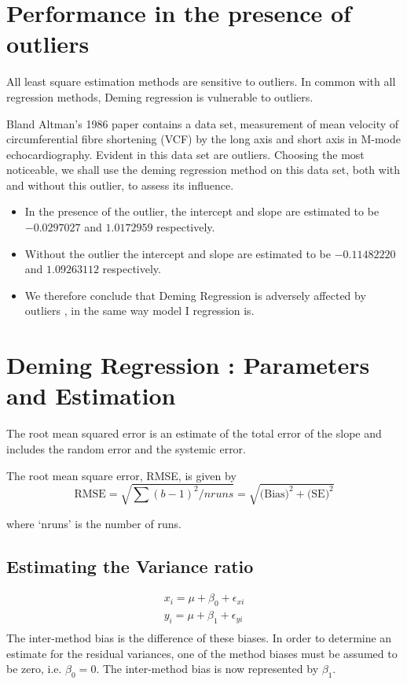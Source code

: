 \documentclass[12pt, a4paper]{report}
\theoremstyle{plain}
\theoremstyle{definition}
\theoremstyle{remark}
\begin{document}
\section{Performance in the presence of outliers}
All least square estimation methods are sensitive to outliers.
In common with all regression methods, Deming regression is vulnerable to outliers. 

Bland Altman's 1986 paper contains a data set, measurement of mean velocity of circumferential fibre shortening (VCF) by the long axis and short axis in M-mode echocardiography. Evident in this data set are outliers. Choosing the most noticeable, we shall use the deming regression method on this data set, both with and
without this outlier, to assess its influence.
\begin{itemize}
	\item In the presence of the outlier, the intercept and slope are estimated to be $-0.0297027$ and $1.0172959$ respectively.
	\item Without the outlier the intercept and slope are estimated to be
	$-0.11482220$ and  $1.09263112$ respectively.
	\item We therefore conclude that Deming Regression is adversely affected
	by outliers , in the same way model I regression is.
\end{itemize}



\section{Deming Regression : Parameters and Estimation}

The root mean squared error is an estimate of the total error of the slope and includes the random error and the systemic error.

The root mean square error, RMSE,  is given by
\begin{equation*}
	\mbox{RMSE} = \sqrt{\sum{(b-1)^2/nruns}} =
	\sqrt{\mbox{(Bias)}^{2}+ \mbox{(SE)}^{2}}
\end{equation*}

where `nruns' is the number of runs.

\subsection{Estimating the Variance ratio}
\begin{eqnarray*}
	x_{i} = \mu +  \beta_{0} + \epsilon_{xi}\\
	y_{i} = \mu +  \beta_{1} + \epsilon_{yi}\\
\end{eqnarray*}
The inter-method bias is the difference of these biases. In order to determine an estimate for the residual variances, one of the method biases must be assumed to be zero, i.e. $\beta_{0} = 0$. The inter-method bias is now represented by $\beta_{1}$.
\end{document}
